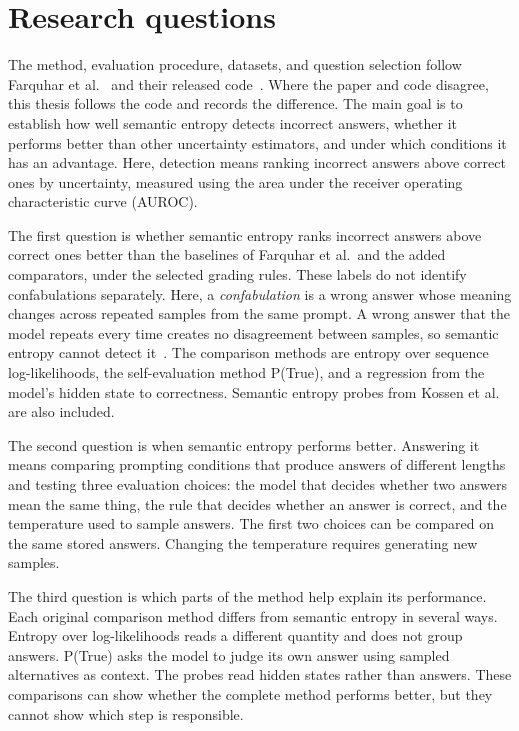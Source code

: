 \section{Research questions}
\label{sec:research-questions}

The method, evaluation procedure, datasets, and question selection follow
Farquhar et al.~\cite{semantic_entropy_nature_2024} and their released
code~\cite{kossen_semantic_uncertainty_code_2024}. Where the paper and code
disagree, this thesis follows the code and records the difference. The main goal is to establish how well semantic entropy detects incorrect
answers, whether it performs better than other uncertainty estimators, and
under which conditions it has an advantage. Here, detection means ranking
incorrect answers above correct ones by uncertainty, measured using the area
under the receiver operating characteristic curve (AUROC).

The first question is whether semantic entropy ranks incorrect answers above
correct ones better than the baselines of Farquhar et al.\ and the added
comparators, under
the selected grading rules. These labels do not identify confabulations
separately. Here, a
\emph{confabulation} is a wrong answer whose meaning changes across repeated
samples from the same prompt. A wrong answer that the model repeats every time
creates no disagreement between samples, so semantic entropy cannot detect
it~\cite{semantic_entropy_nature_2024,simhi_choke_2025}. The
comparison methods are entropy over sequence log-likelihoods, the
self-evaluation method P(True), and a regression from the model's hidden state
to correctness. Semantic entropy probes from Kossen et
al.~\cite{kossen_semantic_entropy_probes_2024} are also included.

The second question is when semantic entropy performs better. Answering it
means comparing prompting conditions that produce answers of different lengths
and testing three evaluation choices: the model that decides whether two answers mean the same thing, the
rule that decides whether an answer is correct, and the temperature used to
sample answers. The first two choices can be compared on the same stored
answers. Changing the temperature requires generating new samples.

The third question is which parts of the method help explain its performance.
Each original comparison method differs from semantic entropy in several ways.
Entropy over log-likelihoods reads a different quantity and does not group
answers. P(True) asks the model to judge its own answer using sampled
alternatives as context. The probes read hidden states rather than answers.
These comparisons can show whether the complete method performs better, but they
cannot show which step is responsible.

